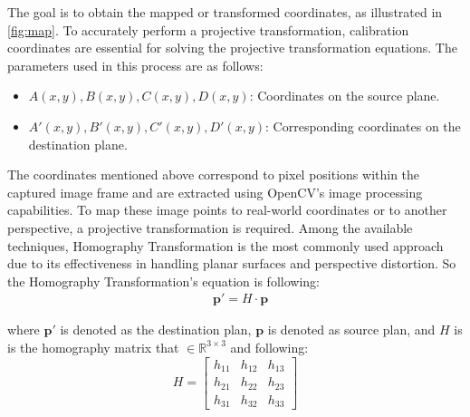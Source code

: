 \documentclass{rithy-thesis}
\begin{document}
The goal is to obtain the mapped or transformed coordinates, as illustrated in \autoref{fig:map}. To accurately perform a projective transformation, calibration coordinates are essential for solving the projective transformation equations. The parameters used in this process are as follows:
\begin{itemize}
\setlength{\itemsep}{0pt}
\item $A(x, y), B(x, y), C(x, y), D(x, y)$: Coordinates on the source plane.
\item $A'(x, y), B'(x, y), C'(x, y), D'(x, y)$: Corresponding coordinates on the destination plane.
\end{itemize}
The coordinates mentioned above correspond to pixel positions within the captured image frame and are extracted using OpenCV's image processing capabilities. To map these image points to real-world coordinates or to another perspective, a projective transformation is required. Among the available techniques, Homography Transformation is the most commonly used approach due to its effectiveness in handling planar surfaces and perspective distortion. So the Homography Transformation's equation is following:
\begin{align}
    &\mathbf{p'} = H \cdot \mathbf{p}  \label{eq: projective}
\end{align}

where $\mathbf{p'}$ is denoted as the destination plan, $\mathbf{p}$ is denoted as source plan, and $H$ is is the homography matrix that $\in \mathbb{R}^{3 \times 3}$ and following:
\begin{equation}
H = 
    \begin{bmatrix}
    h_{11} & h_{12} & h_{13} \\
    h_{21} & h_{22} & h_{23} \\
    h_{31} & h_{32} & h_{33}
    \end{bmatrix}
    \label{homo}
\end{equation}


\end{document}
